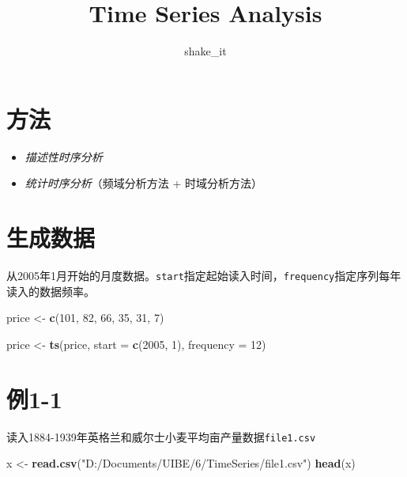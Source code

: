 \documentclass[]{article}
\title{Time Series Analysis}
\author{shake\_it}
\date{}
\newenvironment{Shaded}{\begin{snugshade}}{\end{snugshade}}
\newcommand{\DataTypeTok}[1]{\textcolor[rgb]{0.13,0.29,0.53}{#1}}
\newcommand{\DecValTok}[1]{\textcolor[rgb]{0.00,0.00,0.81}{#1}}
\newcommand{\KeywordTok}[1]{\textcolor[rgb]{0.13,0.29,0.53}{\textbf{#1}}}
\newcommand{\NormalTok}[1]{#1}
\newcommand{\StringTok}[1]{\textcolor[rgb]{0.31,0.60,0.02}{#1}}
\providecommand{\tightlist}{%
  \setlength{\itemsep}{0pt}\setlength{\parskip}{0pt}}
\begin{document}
\maketitle

\hypertarget{ux65b9ux6cd5}{%
\section{方法}\label{ux65b9ux6cd5}}

\begin{itemize}
\tightlist
\item
  \emph{描述性时序分析}
\item
  \emph{统计时序分析}（频域分析方法 + 时域分析方法）
\end{itemize}

\hypertarget{ux751fux6210ux6570ux636e}{%
\section{生成数据}\label{ux751fux6210ux6570ux636e}}

从2005年1月开始的月度数据。\texttt{start}指定起始读入时间，\texttt{frequency}指定序列每年读入的数据频率。

\begin{Shaded}
\begin{Highlighting}[]
\NormalTok{price <-}\StringTok{ }\KeywordTok{c}\NormalTok{(}\DecValTok{101}\NormalTok{, }\DecValTok{82}\NormalTok{, }\DecValTok{66}\NormalTok{, }\DecValTok{35}\NormalTok{, }\DecValTok{31}\NormalTok{, }\DecValTok{7}\NormalTok{)}

\NormalTok{price <-}\StringTok{ }\KeywordTok{ts}\NormalTok{(price, }\DataTypeTok{start =} \KeywordTok{c}\NormalTok{(}\DecValTok{2005}\NormalTok{, }\DecValTok{1}\NormalTok{), }\DataTypeTok{frequency =} \DecValTok{12}\NormalTok{)}
\end{Highlighting}
\end{Shaded}

\hypertarget{ux4f8b1-1}{%
\section{例1-1}\label{ux4f8b1-1}}

读入1884-1939年英格兰和威尔士小麦平均亩产量数据\texttt{file1.csv}

\begin{Shaded}
\begin{Highlighting}[]
\NormalTok{x <-}\StringTok{ }\KeywordTok{read.csv}\NormalTok{(}\StringTok{"D:/Documents/UIBE/6/TimeSeries/file1.csv"}\NormalTok{)}
\KeywordTok{head}\NormalTok{(x)}
\end{Highlighting}
\end{Shaded}
\end{document}
